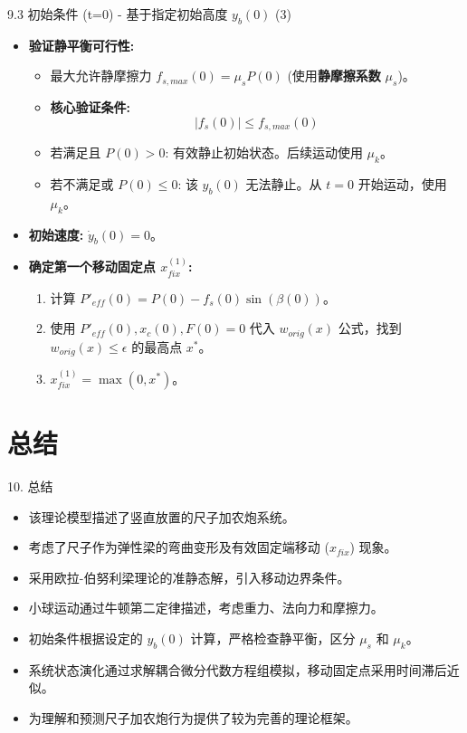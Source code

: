 \documentclass{beamer}
\begin{document}
\begin{frame}{9.3 初始条件 (t=0) - 基于指定初始高度 $y_b(0)$ (3)}
    \begin{itemize}
        \item \textbf{验证静平衡可行性:}
            \begin{itemize}
                \item 最大允许静摩擦力 $f_{s,max}(0) = \mu_s P(0)$ (使用\textbf{静摩擦系数} $\mu_s$)。
                \item \textbf{核心验证条件:}
                    \begin{equation*}
                        \boxed{|f_s(0)| \le f_{s,max}(0)}
                    \end{equation*}
                \item 若满足且 $P(0)>0$: 有效静止初始状态。后续运动使用 $\mu_k$。
                \item 若不满足或 $P(0) \le 0$: 该 $y_b(0)$ 无法静止。从 $t=0$ 开始运动，使用 $\mu_k$。
            \end{itemize}
        \item \textbf{初始速度:} $\dot{y}_b(0) = 0$。
        \item \textbf{确定第一个移动固定点 $x_{fix}^{(1)}$:}
        \begin{enumerate}
            \item 计算 $P'_{eff}(0) = P(0) - f_s(0) \sin(\beta(0))$。
            \item 使用 $P'_{eff}(0), x_c(0), F(0)=0$ 代入 $w_{orig}(x)$ 公式，找到 $w_{orig}(x) \le \epsilon$ 的最高点 $x^*$。
            \item $x_{fix}^{(1)} = \max(0, x^*)$。
        \end{enumerate}
    \end{itemize}
\end{frame}

\section{总结}
\begin{frame}{10. 总结}
    \begin{itemize}
        \item 该理论模型描述了竖直放置的尺子加农炮系统。
        \item 考虑了尺子作为弹性梁的弯曲变形及有效固定端移动 ($x_{fix}$) 现象。
        \item 采用欧拉-伯努利梁理论的准静态解，引入移动边界条件。
        \item 小球运动通过牛顿第二定律描述，考虑重力、法向力和摩擦力。
        \item 初始条件根据设定的 $y_b(0)$ 计算，严格检查静平衡，区分 $\mu_s$ 和 $\mu_k$。
        \item 系统状态演化通过求解耦合微分代数方程组模拟，移动固定点采用时间滞后近似。
        \item 为理解和预测尺子加农炮行为提供了较为完善的理论框架。
    \end{itemize}
\end{frame}

\backmatter %
\end{document}
